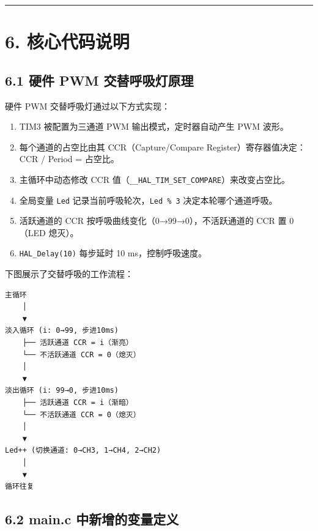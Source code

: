 \documentclass[
  chinese,
  UTF8,
  oneside,
  openany]{ctexbook}
\providecommand{\tightlist}{%
  \setlength{\itemsep}{0pt}\setlength{\parskip}{0pt}}
\begin{document}
\begin{center}\rule{0.5\linewidth}{0.5pt}\end{center}

\section{6. 核心代码说明}\label{ux6838ux5fc3ux4ee3ux7801ux8bf4ux660e-4}

\subsection{6.1 硬件 PWM
交替呼吸灯原理}\label{ux786cux4ef6-pwm-ux4ea4ux66ffux547cux5438ux706fux539fux7406}

硬件 PWM 交替呼吸灯通过以下方式实现：

\begin{enumerate}
\def\labelenumi{\arabic{enumi}.}
\tightlist
\item
  TIM3 被配置为三通道 PWM 输出模式，定时器自动产生 PWM 波形。
\item
  每个通道的占空比由其 CCR（Capture/Compare Register）寄存器值决定：CCR
  / Period = 占空比。
\item
  主循环中动态修改 CCR
  值（\texttt{\_\_HAL\_TIM\_SET\_COMPARE}）来改变占空比。
\item
  全局变量 \texttt{Led} 记录当前呼吸轮次，\texttt{Led\ \%\ 3}
  决定本轮哪个通道呼吸。
\item
  活跃通道的 CCR 按呼吸曲线变化（0→99→0），不活跃通道的 CCR 置 0（LED
  熄灭）。
\item
  \texttt{HAL\_Delay(10)} 每步延时 10 ms，控制呼吸速度。
\end{enumerate}

下图展示了交替呼吸的工作流程：

\begin{verbatim}
主循环
    │
    ▼
淡入循环 (i: 0→99, 步进10ms)
    ├── 活跃通道 CCR = i（渐亮）
    └── 不活跃通道 CCR = 0（熄灭）
    │
    ▼
淡出循环 (i: 99→0, 步进10ms)
    ├── 活跃通道 CCR = i（渐暗）
    └── 不活跃通道 CCR = 0（熄灭）
    │
    ▼
Led++ (切换通道: 0→CH3, 1→CH4, 2→CH2)
    │
    ▼
循环往复
\end{verbatim}

\subsection{6.2 main.c
中新增的变量定义}\label{main.c-ux4e2dux65b0ux589eux7684ux53d8ux91cfux5b9aux4e49-1}
\end{document}
